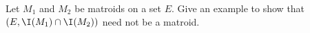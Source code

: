 \prob
{
    Let $M_1$ and $M_2$ be matroids on a set $E$. Give an example to show that
    $(E, \I(M_1) \cap \I(M_2))$ need not be a matroid.
}